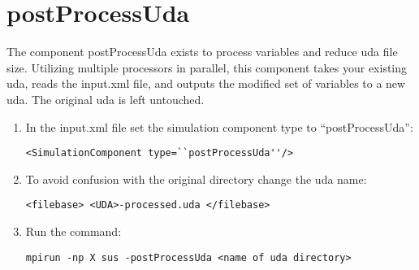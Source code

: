 


\chapter{postProcessUda } \label{Chapter:postProcessUda}
The component postProcessUda exists to process variables and reduce uda file size. Utilizing multiple processors in parallel, this component takes your existing uda, reads the input.xml file, and outputs the modified set of variables to a new uda. The original uda is left untouched.

\begin{enumerate} 
  \item In the input.xml file set the simulation component type to ``postProcessUda'':
    \begin{Verbatim}[fontsize=\footnotesize]
      <SimulationComponent type=``postProcessUda''/>
    \end{Verbatim}
  \item To avoid confusion with the original directory  change the uda name:
    \begin{Verbatim}[fontsize=\footnotesize]
      <filebase> <UDA>-processed.uda </filebase>
    \end{Verbatim}
  \item Run the command:
    \begin{Verbatim}[fontsize=\footnotesize]
      mpirun -np X sus -postProcessUda <name of uda directory>
    \end{Verbatim}
\end{enumerate}

